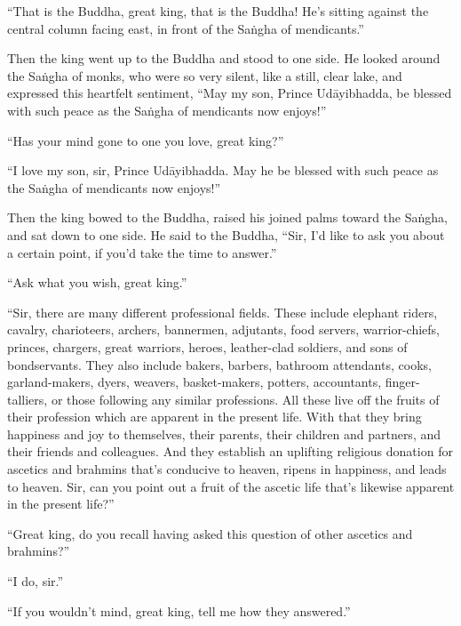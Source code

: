 \documentclass[12pt,openany]{book}%
\begin{document}
“That is the Buddha, great king, that is the Buddha! He’s sitting against the central column facing east, in front of the \textsanskrit{Saṅgha} of mendicants.” 

Then the king went up to the Buddha and stood to one side. He looked around the \textsanskrit{Saṅgha} of monks, who were so very silent, like a still, clear lake, and expressed this heartfelt sentiment, “May my son, Prince \textsanskrit{Udāyibhadda}, be blessed with such peace as the \textsanskrit{Saṅgha} of mendicants now enjoys!” 

“Has your mind gone to one you love, great king?” 

“I love my son, sir, Prince \textsanskrit{Udāyibhadda}. May he be blessed with such peace as the \textsanskrit{Saṅgha} of mendicants now enjoys!” 

Then the king bowed to the Buddha, raised his joined palms toward the \textsanskrit{Saṅgha}, and sat down to one side. He said to the Buddha, “Sir, I’d like to ask you about a certain point, if you’d take the time to answer.” 

“Ask what you wish, great king.” 

“Sir, there are many different professional fields. These include elephant riders, cavalry, charioteers, archers, bannermen, adjutants, food servers, warrior-chiefs, princes, chargers, great warriors, heroes, leather-clad soldiers, and sons of bondservants. They also include bakers, barbers, bathroom attendants, cooks, garland-makers, dyers, weavers, basket-makers, potters, accountants, finger-talliers, or those following any similar professions. All these live off the fruits of their profession which are apparent in the present life. With that they bring happiness and joy to themselves, their parents, their children and partners, and their friends and colleagues. And they establish an uplifting religious donation for ascetics and brahmins that’s conducive to heaven, ripens in happiness, and leads to heaven. Sir, can you point out a fruit of the ascetic life that’s likewise apparent in the present life?” 

“Great king, do you recall having asked this question of other ascetics and brahmins?” 

“I do, sir.” 

“If you wouldn’t mind, great king, tell me how they answered.” 
\end{document}
